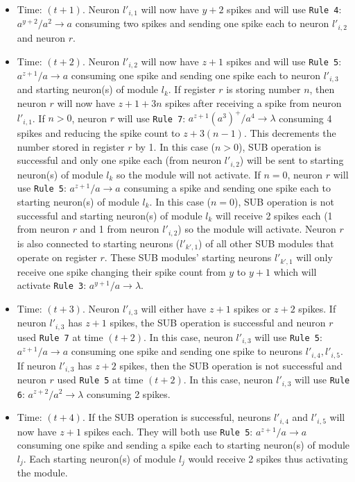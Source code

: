 \documentclass[runningheads,a4paper]{llncs}
\begin{document}
\begin{itemize}
   \item Time: $(t+1)$. Neuron $l'_{i,1}$ will now have $y+2$ spikes and will use \texttt{Rule 4}: $a^{y+2}/a^2 \rightarrow a$ consuming two spikes
                        and sending one spike each to neuron $l'_{i,2}$ and neuron $r$.
   \item Time: $(t+2)$. Neuron $l'_{i,2}$ will now have $z+1$ spikes and will use \texttt{Rule 5}: $a^{z+1}/a \rightarrow a$ consuming one spike and
                        sending one spike each to neuron $l'_{i,3}$ and starting neuron(s) of module $l_k$. If register $r$ is storing number $n$,
                        then neuron $r$ will now have $z+1+3n$ spikes after receiving a spike from neuron $l'_{i,1}$. If $n>0$, neuron $r$ will use 
                        \texttt{Rule 7}: $a^{z+1}(a^3)^+/a^4 \rightarrow \lambda$ consuming 4 spikes and reducing the spike count to $z+3(n-1)$. This
                        decrements the number stored in register $r$ by 1. In this case ($n>0$), SUB operation is successful and only one spike each
                        (from neuron $l'_{i,2}$) will be sent to starting neuron(s) of module $l_k$ so the module will not activate. If $n=0$, neuron
                        $r$ will use \texttt{Rule 5}: $a^{z+1}/a \rightarrow a$ consuming a spike and sending one spike each to starting neuron(s) of
                        module $l_k$. In this case ($n=0$), SUB operation is not successful and starting neuron(s) of module $l_k$ will receive 2 
                        spikes each (1 from neuron $r$ and 1 from neuron $l'_{i,2}$) so the module will activate. Neuron $r$ is also connected to 
                        starting neurons ($l'_{k',1}$) of all other SUB modules that operate on register $r$. These SUB modules' starting neurons
                        $l'_{k',1}$ will only receive one spike changing their spike count from $y$ to $y+1$ which will activate \texttt{Rule 3}:
                        $a^{y+1}/a \rightarrow \lambda$.
   \item Time: $(t+3)$. Neuron $l'_{i,3}$ will either have $z+1$ spikes or $z+2$ spikes. If neuron $l'_{i,3}$ has $z+1$ spikes, the SUB operation is
                        successful and neuron $r$ used \texttt{Rule 7} at time $(t+2)$. In this case, neuron $l'_{i,3}$ will use \texttt{Rule 5}: 
                        $a^{z+1}/a  \rightarrow a$ consuming one spike and sending one spike to neurons $l'_{i,4}, l'_{i,5}$. If neuron $l'_{i,3}$
                        has $z+2$ spikes, then the SUB operation is not successful and neuron $r$ used \texttt{Rule 5} at time $(t+2)$. In this case,
                        neuron $l'_{i,3}$ will use \texttt{Rule 6}: $a^{z+2}/a^2 \rightarrow \lambda$ consuming 2 spikes.
   \item Time: $(t+4)$. If the SUB operation is successful, neurons $l'_{i,4}$ and $l'_{i,5}$ will now have $z+1$ spikes each. They will both use 
                        \texttt{Rule 5}: $a^{z+1}/a  \rightarrow a$ consuming one spike and sending a spike each to starting neuron(s) of module 
                        $l_j$. Each starting neuron(s) of module $l_j$ would receive 2 spikes thus activating the module.
\end{itemize}
\end{document}
